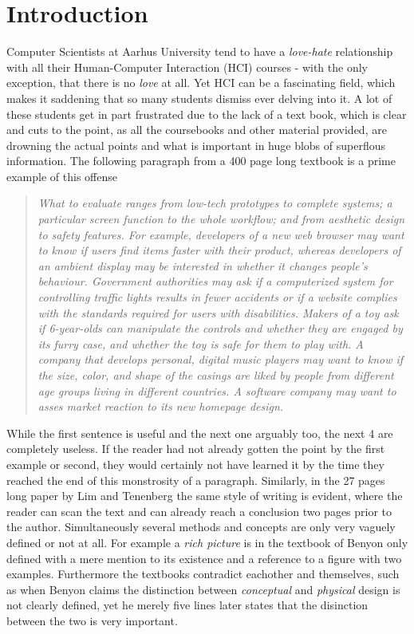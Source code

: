 \chapter{Introduction} \label{chap:introduction}
Computer Scientists at Aarhus University tend to have a \emph{love-hate} relationship with all their Human-Computer Interaction (HCI) courses - with the only exception, that there is no \emph{love} at all. Yet HCI can be a fascinating field, which makes it saddening that so many students dismiss ever delving into it. A lot of these students get in part frustrated due to the lack of a text book, which is clear and cuts to the point, as all the coursebooks and other material provided, are drowning the actual points and what is important in huge blobs of superflous information. The following paragraph from a 400 page long textbook is a prime example of this offense

\blockcquote[p. 435]{rogers}{\it What to evaluate ranges from low-tech prototypes to complete systems; a particular screen function to the whole workflow; and from aesthetic design to safety features. For example, developers of a new web browser may want to know if users find items faster with their product, whereas developers of an ambient display may be interested in whether it changes people's behaviour. Government authorities may ask if a computerized system for controlling traffic lights results in fewer accidents or if a website complies with the standards required for users with disabilities. Makers of a toy ask if 6-year-olds can manipulate the controls and whether they are engaged by its furry case, and whether the toy is safe for them to play with. A company that develops personal, digital music players may want to know if the size, color, and shape of the casings are liked by people from different age groups living in different countries. A software company may want to asses market reaction to its new homepage design.}

\noindent While the first sentence is useful and the next one arguably too, the next 4 are completely useless. If the reader had not already gotten the point by the first example or second, they would certainly not have learned it by the time they reached the end of this monstrosity of a paragraph. Similarly, in the 27 pages long paper by Lim and Tenenberg \cite{lim} the same style of writing is evident, where the reader can scan the text and can already reach a conclusion two pages prior to the author. Simultaneously several methods and concepts are only very vaguely defined or not at all. For example a \emph{rich picture} is in the textbook of Benyon only defined with a mere mention to its existence and a reference to a figure with two examples. \cite[p. 51-52]{benyon_14} Furthermore the textbooks contradict eachother and themselves, such as when Benyon claims the distinction between \emph{conceptual} and \emph{physical} design is not clearly defined, yet he merely five lines later states that the disinction between the two is very important. \cite[p. 51]{benyon_14}

